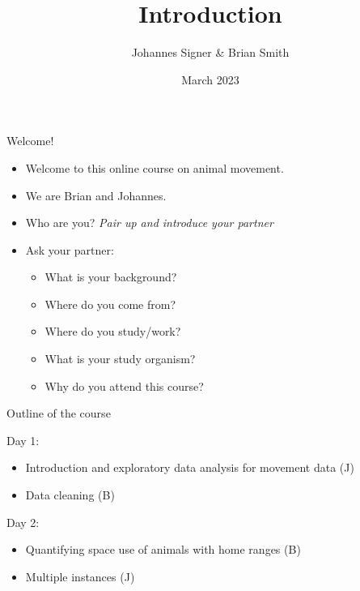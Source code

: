 \documentclass[ignorenonframetext,,t]{beamer}
\title{Introduction}
\author{Johannes Signer \& Brian Smith}
\date{March 2023}
\providecommand{\tightlist}{%
\setlength{\itemsep}{0pt}\setlength{\parskip}{0pt}}
\providecommand{\tightlist}{%
\setlength{\itemsep}{0pt}\setlength{\parskip}{0pt}}
\renewcommand{\tightlist}{\setlength{\itemsep}{1.4ex}\setlength{\parskip}{0pt}}
\begin{document}
\frame{\titlepage}



\begin{frame}{Welcome!}
\protect\hypertarget{welcome}{}
\begin{itemize}
\item
  Welcome to this online course on animal movement.
\item
  We are Brian and Johannes.
\item
  Who are you? \emph{Pair up and introduce your partner}
\item
  Ask your partner:

  \begin{itemize}
  \tightlist
  \item
    What is your background?
  \item
    Where do you come from?
  \item
    Where do you study/work?
  \item
    What is your study organism?
  \item
    Why do you attend this course?
  \end{itemize}
\end{itemize}
\end{frame}

\begin{frame}{Outline of the course}
\protect\hypertarget{outline-of-the-course}{}
\begin{block}{Day 1:}
\protect\hypertarget{day-1}{}
\begin{itemize}
\tightlist
\item
  Introduction and exploratory data analysis for movement data (J)
\item
  Data cleaning (B)
\end{itemize}
\end{block}

\begin{block}{Day 2:}
\protect\hypertarget{day-2}{}
\begin{itemize}
\tightlist
\item
  Quantifying space use of animals with home ranges (B)
\item
  Multiple instances (J)
\end{itemize}
\end{block}
\end{frame}
\end{document}
